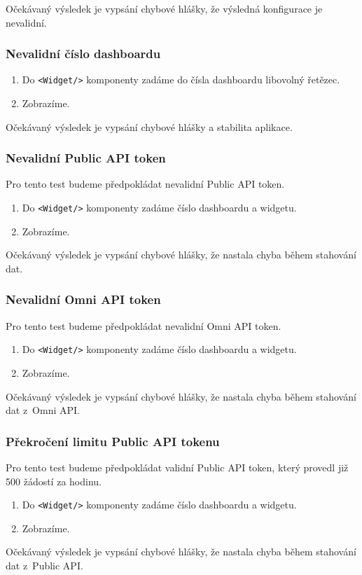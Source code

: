 \documentclass[czech, bc, kiv, he, iso690numb, viewonly]{fasthesis} %
\begin{document}
Očekávaný výsledek je vypsání chybové hlášky, že výsledná konfigurace je nevalidní.

\subsubsection{Nevalidní číslo dashboardu}
\begin{enumerate}
	\item Do \texttt{<Widget/>} komponenty zadáme do čísla dashboardu libovolný řetězec.
	\item Zobrazíme.
\end{enumerate}
Očekávaný výsledek je vypsání chybové hlášky a stabilita aplikace.

\subsubsection{Nevalidní Public API token}
Pro tento test budeme předpokládat nevalidní Public API token.
\begin{enumerate}
	\item Do \texttt{<Widget/>} komponenty zadáme číslo dashboardu a widgetu.
	\item Zobrazíme.
\end{enumerate}
Očekávaný výsledek je vypsání chybové hlášky, že nastala chyba během stahování dat.

\subsubsection{Nevalidní Omni API token}
Pro tento test budeme předpokládat nevalidní Omni API token.
\begin{enumerate}
	\item Do \texttt{<Widget/>} komponenty zadáme číslo dashboardu a widgetu.
	\item Zobrazíme.
\end{enumerate}
Očekávaný výsledek je vypsání chybové hlášky, že nastala chyba během stahování dat z~Omni API.

\subsubsection{Překročení limitu Public API tokenu}
Pro tento test budeme předpokládat validní Public API token, který provedl již 500 žádostí za hodinu.
\begin{enumerate}
	\item Do \texttt{<Widget/>} komponenty zadáme číslo dashboardu a widgetu.
	\item Zobrazíme.
\end{enumerate}
Očekávaný výsledek je vypsání chybové hlášky, že nastala chyba během stahování dat z~Public API.
\end{document}
